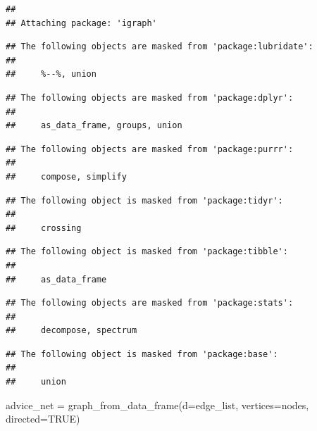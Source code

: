 \documentclass[
]{article}
\newenvironment{Shaded}{\begin{snugshade}}{\end{snugshade}}
\newcommand{\AttributeTok}[1]{\textcolor[rgb]{0.77,0.63,0.00}{#1}}
\newcommand{\ConstantTok}[1]{\textcolor[rgb]{0.00,0.00,0.00}{#1}}
\newcommand{\FunctionTok}[1]{\textcolor[rgb]{0.00,0.00,0.00}{#1}}
\newcommand{\NormalTok}[1]{#1}
\newcommand{\OtherTok}[1]{\textcolor[rgb]{0.56,0.35,0.01}{#1}}
\begin{document}
\begin{verbatim}
## 
## Attaching package: 'igraph'
\end{verbatim}

\begin{verbatim}
## The following objects are masked from 'package:lubridate':
## 
##     %--%, union
\end{verbatim}

\begin{verbatim}
## The following objects are masked from 'package:dplyr':
## 
##     as_data_frame, groups, union
\end{verbatim}

\begin{verbatim}
## The following objects are masked from 'package:purrr':
## 
##     compose, simplify
\end{verbatim}

\begin{verbatim}
## The following object is masked from 'package:tidyr':
## 
##     crossing
\end{verbatim}

\begin{verbatim}
## The following object is masked from 'package:tibble':
## 
##     as_data_frame
\end{verbatim}

\begin{verbatim}
## The following objects are masked from 'package:stats':
## 
##     decompose, spectrum
\end{verbatim}

\begin{verbatim}
## The following object is masked from 'package:base':
## 
##     union
\end{verbatim}

\begin{Shaded}
\begin{Highlighting}[]
\NormalTok{advice\_net }\OtherTok{=} \FunctionTok{graph\_from\_data\_frame}\NormalTok{(}\AttributeTok{d=}\NormalTok{edge\_list, }\AttributeTok{vertices=}\NormalTok{nodes, }\AttributeTok{directed=}\ConstantTok{TRUE}\NormalTok{)}
\end{Highlighting}
\end{Shaded}
\end{document}
